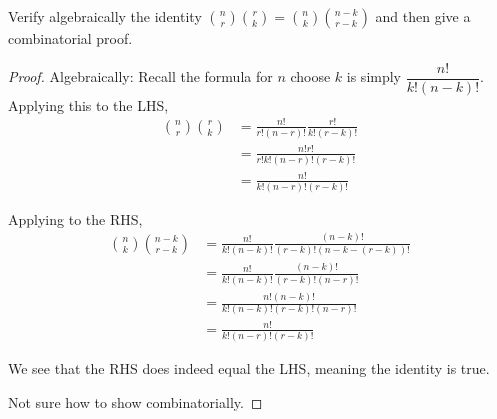 \documentclass[11pt]{article}
\newenvironment{problem}[2][Problem\!]{\begin{trivlist}
\item[\hskip \labelsep {\bfseries #1}\hskip \labelsep {\bfseries #2}]}{\end{trivlist}}
\begin{document}
\newpage
\begin{tcolorbox}
    \begin{problem} {IC - 10/29 - 105.}
        Verify algebraically the identity $\binom{n}{r} \binom{r}{k} = \binom{n}{k}\binom{n-k}{r-k}$ and then give a combinatorial proof. 
    \end{problem}
\end{tcolorbox}
\begin{proof}
    Algebraically: Recall the formula for $n$ choose $k$ is simply $\dfrac{n!}{k!(n-k)!}$. Applying this to the LHS,
    \begin{align*}
        \binom{n}{r} \binom{r}{k} &= \frac{n!}{r!(n-r)!}\frac{r!}{k!(r-k)!} \\
        &= \frac{n!r!}{r!k!(n-r)!(r-k)!} \\
        &= \frac{n!}{k!(n-r)!(r-k)!}
    \end{align*}

    Applying to the RHS,
    \begin{align*}
        \binom{n}{k}\binom{n-k}{r-k} &= \frac{n!}{k!(n-k)!}\frac{(n-k)!}{(r-k)!(n-k - (r-k))!} \\
        &=\frac{n!}{k!(n-k)!}\frac{(n-k)!}{(r-k)!(n-r)!} \\
        &= \frac{n! (n-k)!}{k!(n-k)!(r-k)!(n-r)!} \\
        &= \frac{n!}{k!(n-r)!(r-k)!}
    \end{align*}
    
    We see that the RHS does indeed equal the LHS, meaning the identity is true.

    Not sure how to show combinatorially.
\end{proof}
\end{document}
